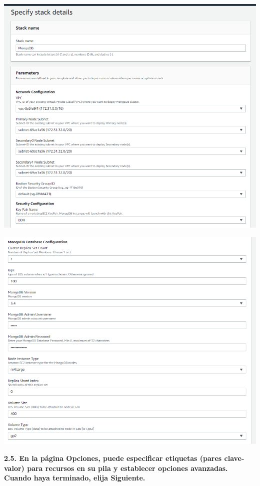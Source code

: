 \documentclass{article}
\begin{document}
    \begin{center}
		\includegraphics[width=15cm]{./images/t1} 
	\end{center}
	\begin{center}
		\includegraphics[width=15cm]{./images/t2} 
	\end{center}


\textbf{2.5. 
En la página Opciones, puede especificar etiquetas (pares clave-valor) para recursos en su pila y establecer opciones avanzadas. Cuando haya terminado, elija Siguiente. }
\end{document}
